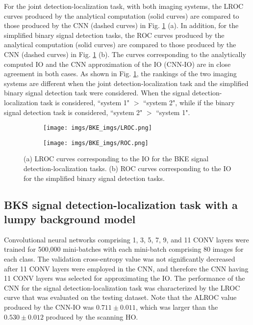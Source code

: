 \documentclass[journal]{IEEEtran}
\begin{document}
For the joint detection-localization task, with both imaging systems,
the LROC curves produced by the analytical computation (solid curves) are compared to those produced by the CNN (dashed curves) in Fig. \ref{fig:BKE} (a). 
In addition, for the simplified binary signal detection tasks, the ROC curves  produced by the analytical computation (solid curves) are compared to those produced by the CNN (dashed curves) in Fig. \ref{fig:BKE} (b). 
The curves corresponding to the analytically computed IO and the CNN approximation of the IO (CNN-IO) are in close agreement in both cases.
As shown in Fig. \ref{fig:BKE}, the rankings of the two imaging systems are different when the joint detection-localization task and 
the simplified binary signal detection task were considered.
When the  signal detection-localization task is considered, ``system 1" $>$ ``system 2", while
if the binary signal detection task is considered, ``system 2" $>$ ``system 1".
\begin{figure}[t!]
\centering
\begin{subfigure}[b]{0.45\textwidth}
   \centering
 \texttt{[image: imgs/BKE\_imgs/LROC.png]}
 \vspace{-0.7cm}
 \caption{}
 \end{subfigure}
 
 \begin{subfigure}[b]{0.45\textwidth}
  \centering
 \texttt{[image: imgs/BKE\_imgs/ROC.png]}
  \vspace{-0.7cm}
  \caption{}
 \end{subfigure}
 \vspace{-0.2cm} \caption{(a) LROC curves corresponding to the IO for the BKE signal detection-localization tasks. (b) ROC curves corresponding to the IO for  the simplified binary signal detection tasks.}
 \label{fig:BKE}
 \vspace{-0.45cm}
\end{figure}

 \vspace{-0.4cm}
\subsection{BKS signal detection-localization task with a lumpy background model}
Convolutional neural networks comprising 1, 3, 5, 7, 9, and 11 CONV layers were trained for 500,000 mini-batches with each mini-batch comprising 80 images for each class. 
The validation cross-entropy value was not significantly decreased after 11 CONV layers were employed in the CNN, and therefore the CNN having 11 CONV layers 
was selected for approximating the IO.
The performance of the CNN for the signal detection-localization task was characterized by the LROC curve that was evaluated on the testing dataset.
Note that the ALROC value produced by the CNN-IO  was $0.711\pm {0.011}$,
which was larger than the $0.530\pm {0.012}$
 produced by the scanning HO.
\end{document}

